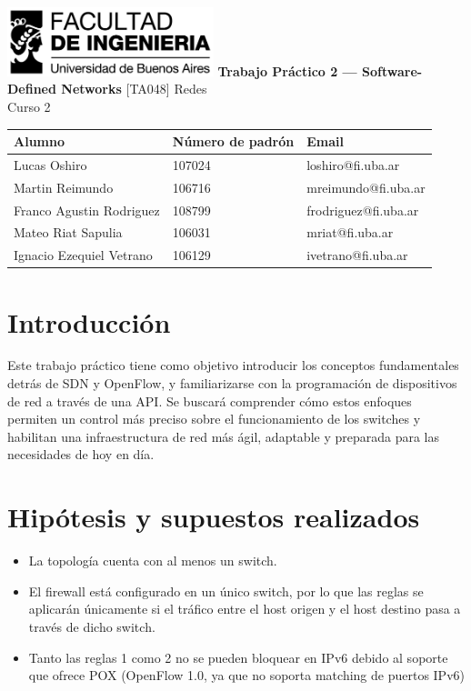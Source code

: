 \documentclass[titlepage,a4paper]{article}
\begin{document}
\begin{titlepage} %
    \hfill\includegraphics[width=6cm]{img/logofiuba.jpg}
    \centering
    \vfill
    \Huge \textbf{Trabajo Práctico 2 —  Software-Defined Networks}
    \vskip2cm
    \Large [TA048] Redes \\
    Curso 2 \\ 
    \vfill
    \begin{tabular}{ | l | l | l |}
      \hline
      Alumno & Número de padrón & Email \\ \hline
      Lucas Oshiro & 107024 & loshiro@fi.uba.ar \\ \hline
      Martin Reimundo & 106716 & mreimundo@fi.uba.ar \\ \hline
      Franco Agustin Rodriguez & 108799 & frodriguez@fi.uba.ar \\ \hline
      Mateo Riat Sapulia & 106031 & mriat@fi.uba.ar \\ \hline
      Ignacio Ezequiel Vetrano & 106129 & ivetrano@fi.uba.ar \\ \hline
    \end{tabular}
    \vfill
    \vfill
\end{titlepage}

\tableofcontents %
\newpage

\section{Introducción}\label{sec:intro}

    Este trabajo práctico tiene como objetivo introducir los conceptos fundamentales detrás de SDN y OpenFlow, y familiarizarse con la programación de dispositivos de red a través de una API. Se buscará comprender cómo estos enfoques permiten un control más preciso sobre el funcionamiento de los switches y habilitan una infraestructura de red más ágil, adaptable y preparada para las necesidades de hoy en día.



\section{Hipótesis y supuestos realizados}\label{sec:supuestos}

    \begin{itemize}
        \item La topología cuenta con al menos un switch.

        \item El firewall está configurado en un único switch, por lo que las reglas se aplicarán únicamente si el tráfico entre el host origen y el host destino pasa a través de dicho switch.

        \item Tanto las reglas 1 como 2 no se pueden bloquear en IPv6 debido al soporte que ofrece POX (OpenFlow 1.0, ya que no soporta matching de puertos IPv6)
    \end{itemize}
    
\end{document}
